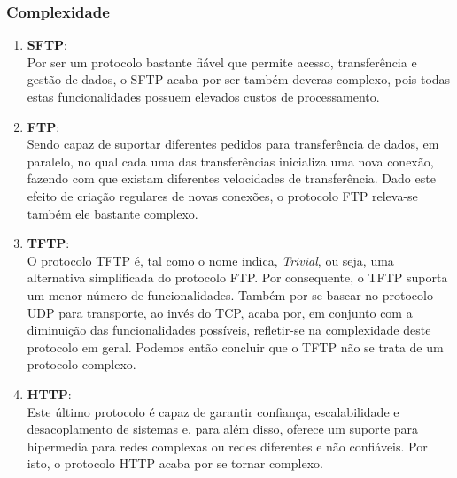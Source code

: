 \documentclass[11pt]{article}
\begin{document}
\subsubsection{Complexidade}
\begin{enumerate}
  \item \textbf{SFTP}:\\
  Por ser um protocolo bastante fiável que permite acesso, transferência e gestão de dados, o SFTP acaba por ser também deveras complexo, pois todas estas funcionalidades possuem elevados custos de processamento.
  \item \textbf{FTP}:\\
  Sendo capaz de suportar diferentes pedidos para transferência de dados, em paralelo, no qual cada uma das transferências inicializa uma nova conexão, fazendo com que existam diferentes velocidades de transferência. Dado este efeito de criação regulares de novas conexões, o protocolo FTP releva-se também ele bastante complexo.
  \item \textbf{TFTP}:\\
  O protocolo TFTP é, tal como o nome indica, \textit{Trivial}, ou seja, uma alternativa simplificada do protocolo FTP. Por consequente, o TFTP suporta um menor número de funcionalidades. Também por se basear no protocolo UDP para transporte, ao invés do TCP, acaba por, em conjunto com a diminuição das funcionalidades possíveis, refletir-se na complexidade deste protocolo em geral. Podemos então concluir que o TFTP não se trata de um protocolo complexo.
  \item \textbf{HTTP}:\\
  Este último protocolo é capaz de garantir confiança, escalabilidade e desacoplamento de sistemas e, para além disso, oferece um suporte para hipermedia para redes complexas ou redes diferentes e não confiáveis. Por isto, o protocolo HTTP acaba por se tornar complexo.
\end{enumerate}
\end{document}
